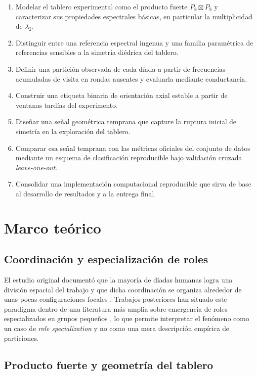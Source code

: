 \documentclass[journal]{IEEEtran}
\begin{document}
\begin{enumerate}
\item Modelar el tablero experimental como el producto fuerte $P_8 \boxtimes P_8$ y caracterizar sus propiedades espectrales básicas, en particular la multiplicidad de $\lambda_2$.
\item Distinguir entre una referencia espectral ingenua y una familia paramétrica de referencias sensibles a la simetría diédrica del tablero.
\item Definir una partición observada de cada díada a partir de frecuencias acumuladas de visita en rondas ausentes y evaluarla mediante conductancia.
\item Construir una etiqueta binaria de orientación axial estable a partir de ventanas tardías del experimento.
\item Diseñar una señal geométrica temprana que capture la ruptura inicial de simetría en la exploración del tablero.
\item Comparar esa señal temprana con las métricas oficiales del conjunto de datos mediante un esquema de clasificación reproducible bajo validación cruzada \emph{leave-one-out}.
\item Consolidar una implementación computacional reproducible que sirva de base al desarrollo de resultados y a la entrega final.
\end{enumerate}

\section{Marco teórico}

\subsection{Coordinación y especialización de roles}

El estudio original documentó que la mayoría de díadas humanas logra una división espacial del trabajo y que dicha coordinación se organiza alrededor de unas pocas configuraciones focales \cite{andrade2021}. Trabajos posteriores han situado este paradigma dentro de una literatura más amplia sobre emergencia de roles especializados en grupos pequeños \cite{goldstone2024}, lo que permite interpretar el fenómeno como un caso de \emph{role specialization} y no como una mera descripción empírica de particiones.

\subsection{Producto fuerte y geometría del tablero}
\end{document}
